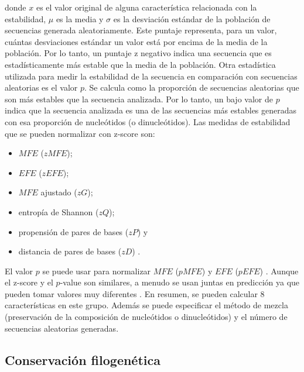 \noindent donde $x$ es el valor original de alguna característica relacionada con la estabilidad, $\mu$ es la media y $\sigma$ es la desviación estándar de la
población de secuencias generada aleatoriamente. Este puntaje representa, para un valor, cuántas desviaciones estándar un valor está por encima de la media de
la población. Por lo tanto, un puntaje z negativo indica una secuencia que es estadísticamente más estable que la media de la población. Otra estadística
utilizada para medir la estabilidad de la secuencia en comparación con secuencias aleatorias es el valor $p$. Se calcula como la proporción de secuencias
aleatorias que son más estables que la secuencia analizada. Por lo tanto, un bajo valor de $p$ indica que la secuencia analizada es una de las secuencias más
estables generadas con esa proporción de nucleótidos (o dinucleótidos). Las medidas de estabilidad que se pueden normalizar con z-score son:
\begin{itemize}
	\item $ MFE $ ($ zMFE $);
	\item $ EFE $ ($ zEFE $);
	\item $ MFE $ ajustado ($ zG $);
	\item entropía de Shannon ($ zQ $);
	\item propensión de pares de bases ($ zP $) \citep{ng2007novo} y
	\item distancia de pares de bases ($ zD $) \citep{ding2010mirensvm}.
\end{itemize}

El valor $p$ se puede usar para normalizar $ MFE $ ($ pMFE $) \citep{bonnet2004evidence} y $ EFE $ ($ pEFE $) \citep{ding2010mirensvm}. Aunque el z-score y el
$p$-value son similares, a menudo se usan juntas en predicción ya que pueden tomar valores muy diferentes \citep{ding2010mirensvm}. En resumen, se pueden
calcular 8 características en este grupo. Además se puede especificar el método de mezcla (preservación de la composición de nucleótidos o dinucleótidos) y el
número de secuencias aleatorias generadas.

\subsection{Conservación filogenética}

